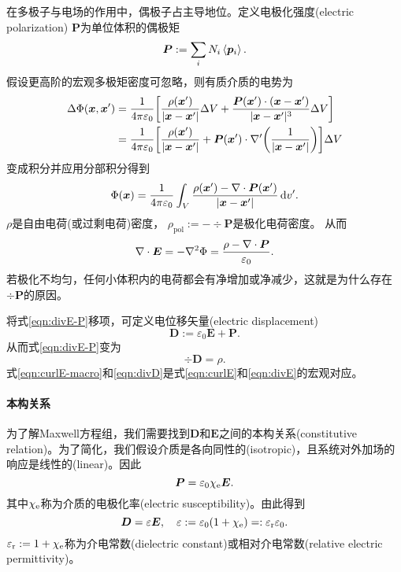 在多极子与电场的作用中，偶极子占主导地位。定义电极化强度(electric polarization) $\bm P$为单位体积的偶极矩
\begin{equation}
    \bm P:=\sum_i N_i\left\langle \bm p_i\right\rangle.
\end{equation}
假设更高阶的宏观多极矩密度可忽略，则有质介质的电势为
\begin{align*}
    \Delta\Phi(\bm x,\bm x')&=\frac1{4\pi\varepsilon_0}\biggl[\frac{\rho(\bm x')}{|\bm x-\bm x'|}\Delta V+\frac{\bm P(\bm x')\cdot(\bm x-\bm x')}{|\bm x-\bm x'|^3}\Delta V\biggr]\\
    &=\frac1{4\pi\varepsilon_0}\biggl[\frac{\rho(\bm x')}{|\bm x-\bm x'|}+\bm P(\bm x')\cdot\nabla'\biggl(\frac1{|\bm x-\bm x'|}\biggr)\biggr]\Delta V
\end{align*}
变成积分并应用分部积分得到
\begin{equation}
    \Phi(\bm x)=\frac1{4\pi\varepsilon_0}\int_V\frac{\rho(\bm x')-\nabla\cdot\bm P(\bm x')}{|\bm x-\bm x'|}\mathop{}\!\mathrm{d} v'.
\end{equation}
$\rho$是自由电荷(或过剩电荷)密度，
$\rho_\text{pol}:=-\div\bm P$是极化电荷密度。%
从而
\begin{equation}
    \label{eqn:divE-P}
    \nabla\cdot\bm E=-\nabla^2\Phi=\frac{\rho-\nabla\cdot\bm P}{\varepsilon_0}.
\end{equation}
若极化不均匀，任何小体积内的电荷都会有净增加或净减少，这就是为什么存在$\div\bm P$的原因。

将式\eqref{eqn:divE-P}移项，可定义电位移矢量(electric displacement)
\begin{equation}
    \bm D:=\varepsilon_0\bm E+\bm P.
\end{equation}
从而式\eqref{eqn:divE-P}变为 
\begin{equation}
    \label{eqn:divD}
    \div\bm D=\rho.
\end{equation}
式\eqref{eqn:curlE-macro}和\eqref{eqn:divD}是式\eqref{eqn:curlE}和\eqref{eqn:divE}的宏观对应。
\paragraph{本构关系}
为了解Maxwell方程组，我们需要找到$\bm D$和$\bm E$之间的本构关系(constitutive relation)。为了简化，我们假设介质是各向同性的(isotropic)，且系统对外加场的响应是线性的(linear)。因此
\begin{equation}
    \bm P=\varepsilon_0\chi_\mathrm e\bm E.
\end{equation}
其中$\chi_\mathrm e$称为介质的电极化率(electric susceptibility)。由此得到 
\begin{equation}
    \bm D=\varepsilon\bm E,\quad \varepsilon:=\varepsilon_0(1+\chi_\mathrm e)=:\varepsilon_\text r\varepsilon_0.
\end{equation}
$\varepsilon_\text r:=1+\chi_\mathrm e$称为介电常数(dielectric constant)或相对介电常数(relative electric permittivity)。

